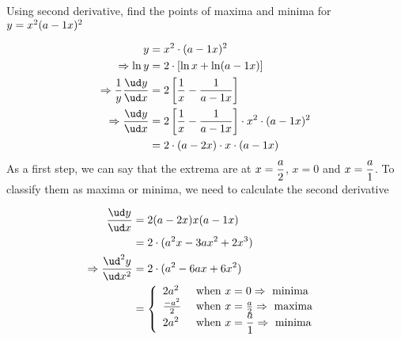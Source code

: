 



\question[3] Using second derivative, find the points of maxima and minima for $y=x^2(a-1 x)^2$

\watchout

\ifprintanswers
\fi 

\begin{solution}[\fullpage]
  \begin{align}
     y &= x^2\cdot(a-\vbone x)^2 \\
     \Rightarrow \ln y &= 2\cdot \left[\ln x + \ln (a-\vbone x)\right] \\
     \Rightarrow \dfrac{1}{y}\dfrac{\ud y}{\ud x} &= 2\left[ \dfrac{1}{x} - \dfrac{\vbone}{a-\vbone x}\right] \\
     \Rightarrow \dfrac{\ud y}{\ud x} &= 2\left[ \dfrac{1}{x} - \dfrac{\vbone}{a-\vbone x}\right]
                                         \cdot x^2\cdot (a-\vbone x)^2 \\
                                      &= 2\cdot(a-\vbtwo x)\cdot x \cdot (a-\vbone x)
  \end{align}
  As a first step, we can say that the extrema are at $x=\dfrac{a}{2}$, $x=0$ and $x=\dfrac{a}{1}$.
  To classify them as maxima or minima, we need to calculate the second derivative
  
  \begin{align}
     \dfrac{\ud y}{\ud x} &= 2(a-\vbtwo x)x(a-\vbone x) \\
            &= 2\cdot(a^2x - \vbthree ax^2 + \vbsix x^3) \\
     \Rightarrow \dfrac{\ud^2 y}{\ud x^2} &= 2\cdot(a^2 - \vbfour ax + \vbfive x^2) \\
     &= \left\lbrace
        \begin{array}{l l}
          2a^2 & \text{ when } x = 0 \Rightarrow \text{ minima } \\
          \frac{-a^2}{2} & \text{ when } x = \frac{a}{\vbtwo} \Rightarrow \text{ maxima } \\
          2a^2 & \text{ when } x = \dfrac{a}{\vbone} \Rightarrow \text{ minima }
        \end{array}\right.
  \end{align}
  
\end{solution}
